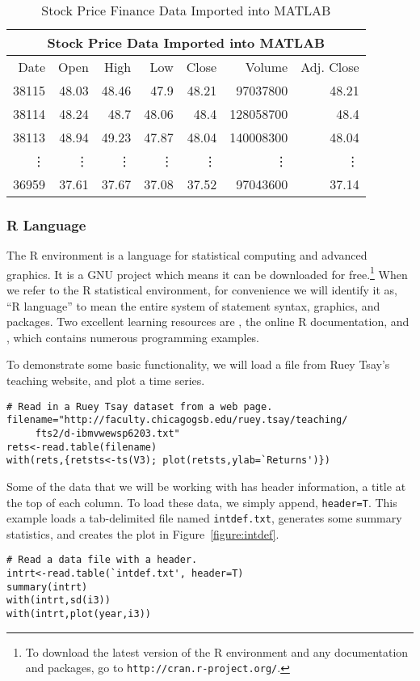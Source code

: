 \begin{table}[htbp]
	\centering
	\begin{tabular}{rrrrrrr}
	\toprule
	\multicolumn{7}{c}{Stock Price Data Imported into MATLAB} \\
	\hline
	Date	& Open & High	& Low & Close	& Volume	& Adj. Close \\
	\hline
	38115 &	48.03 &	48.46 & 47.9 &	48.21 &	97037800	 & 48.21\\
	38114 &	48.24 &	48.7	&  48.06 & 48.4	 & 128058700	& 48.4\\
	38113 &	48.94 &	49.23 & 47.87 & 48.04 &	140008300 &	48.04 \\
	\vdots & \vdots & \vdots & \vdots & \vdots & \vdots & \vdots \\
	36959 &	37.61 &	37.67 &	37.08 &	37.52 &	97043600 &	37.14 \\
	\bottomrule
	\end{tabular}
	\caption{Stock Price Finance Data Imported into MATLAB}
	\label{tab:matlab-xl}
\end{table}

\subsubsection{R Language}
The R environment is a language for statistical computing and advanced graphics. It is a GNU project which means it can be downloaded for free.\footnote{To download the latest version of the R environment and any documentation and packages, go to \texttt{http://cran.r-project.org/}.} When we refer to the R statistical environment, for convenience we will identify it as, ``R language'' to mean the entire system of statement syntax, graphics, and packages. Two excellent learning resources are , the online R documentation, and , which contains numerous programming examples.

To demonstrate some basic functionality, we will load a file from Ruey Tsay's teaching website, and plot a time series.
\begin{verbatim}
# Read in a Ruey Tsay dataset from a web page.
filename="http://faculty.chicagogsb.edu/ruey.tsay/teaching/
     fts2/d-ibmvwewsp6203.txt"
rets<-read.table(filename) 
with(rets,{retsts<-ts(V3); plot(retsts,ylab=`Returns')})
\end{verbatim}

Some of the data that we will be working with has header information, a title at the top of each column. To load these data, we simply append, \texttt{header=T}. This example loads a tab-delimited file named \texttt{intdef.txt}, generates some summary statistics, and creates the plot in Figure~\ref{figure:intdef}.
\begin{verbatim}
# Read a data file with a header.
intrt<-read.table(`intdef.txt', header=T)
summary(intrt)
with(intrt,sd(i3))
with(intrt,plot(year,i3))
\end{verbatim}

